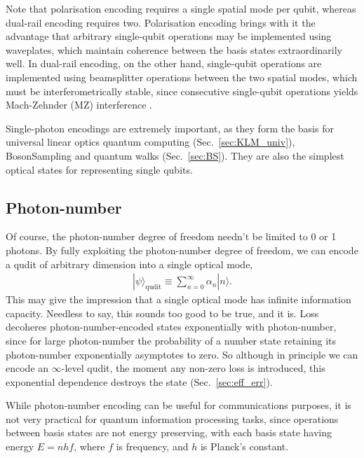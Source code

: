 \documentclass[aps,rmp,twocolumn,amsmath,amssymb,nofootinbib,superscriptaddress,longbibliography,floatfix]{revtex4-1}
\newcommand{\ket}[1]{|#1\rangle}
\begin{document}
Note that polarisation encoding requires a single spatial mode per qubit, whereas dual-rail encoding requires two. Polarisation encoding brings with it the advantage that arbitrary single-qubit operations may be implemented using waveplates, which maintain coherence between the basis states extraordinarily well. In dual-rail encoding, on the other hand, single-qubit operations are implemented using beamsplitter operations between the two spatial modes, which must be interferometrically stable, since consecutive single-qubit operations yields Mach-Zehnder (MZ) interference \cite{bib:MachZehnder}.

Single-photon encodings are extremely important, as they form the basis for universal linear optics quantum computing (Sec.~\ref{sec:KLM_univ}), {\sc BosonSampling} and quantum walks (Sec.~\ref{sec:BS}). They are also the simplest optical states for representing single qubits.

%
%

\subsection{Photon-number}

Of course, the photon-number degree of freedom needn't be limited to 0 or 1 photons. By fully exploiting the photon-number degree of freedom, we can encode a qudit of arbitrary dimension into a single optical mode,
\begin{align} \label{eq:number_qudit}
\ket\psi_\mathrm{qudit} \equiv \sum_{n=0}^\infty \alpha_n \ket{n}.
\end{align}
This may give the impression that a single optical mode has infinite information capacity. Needless to say, this sounds too good to be true, and it is. Loss decoheres photon-number-encoded states exponentially with photon-number, since for large photon-number the probability of a number state retaining its photon-number exponentially asymptotes to zero. So although in principle we can encode an $\infty$-level qudit, the moment any non-zero loss is introduced, this exponential dependence destroys the state (Sec.~\ref{sec:eff_err}).

While photon-number encoding can be useful for communications purposes, it is not very practical for quantum information processing tasks, since operations between basis states are not energy preserving, with each basis state having energy \mbox{$E=nhf$}, where $f$ is frequency, and $h$ is Planck's constant.

%
%
\end{document}
